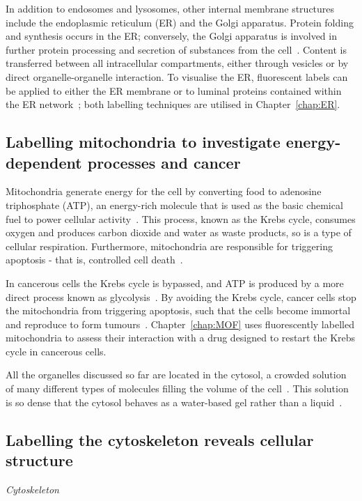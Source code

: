 In addition to endosomes and lysosomes, other internal membrane structures include the endoplasmic reticulum (ER) and the Golgi apparatus. 
Protein folding and synthesis occurs in the ER; conversely, the Golgi apparatus is involved in further protein processing and secretion of substances from the cell~\cite{dyson1978cell}. 
Content is transferred between all intracellular compartments, either through vesicles or by direct organelle-organelle interaction. 
To visualise the ER, fluorescent labels can be applied to either the ER membrane or to luminal proteins contained within the ER network~\cite{costantini2013probing}; both labelling techniques are utilised in Chapter~\ref{chap:ER}.  

\subsection{Labelling mitochondria to investigate energy-dependent processes and cancer}
Mitochondria generate energy for the cell by converting food to adenosine triphosphate (ATP), an energy-rich molecule that is used as the basic chemical fuel to power cellular activity~\cite{alberts2013essential}. 
This process, known as the Krebs cycle, consumes oxygen and produces carbon dioxide and water as waste products, so is a type of cellular respiration. 
Furthermore, mitochondria are responsible for triggering apoptosis - that is, controlled cell death~\cite{murray1993cell}. 

In cancerous cells the Krebs cycle is bypassed, and ATP is produced by a more direct process known as glycolysis~\cite{warburg1930uber}. 
By avoiding the Krebs cycle, cancer cells stop the mitochondria from triggering apoptosis, such that the cells become immortal and reproduce to form tumours~\cite{murray1993cell}. 
Chapter~\ref{chap:MOF} uses fluorescently labelled  mitochondria to assess their interaction with a drug designed to restart the Krebs cycle in cancerous cells. 

All the organelles discussed so far are located in the cytosol, a crowded solution of many different types of molecules filling the volume of the cell~\cite{goodsell1991inside}. 
This solution is so dense that the cytosol behaves as a water-based gel rather than a liquid~\cite{alberts2013essential}. 

\subsection{Labelling the cytoskeleton reveals cellular structure}
\textit{Cytoskeleton} %

